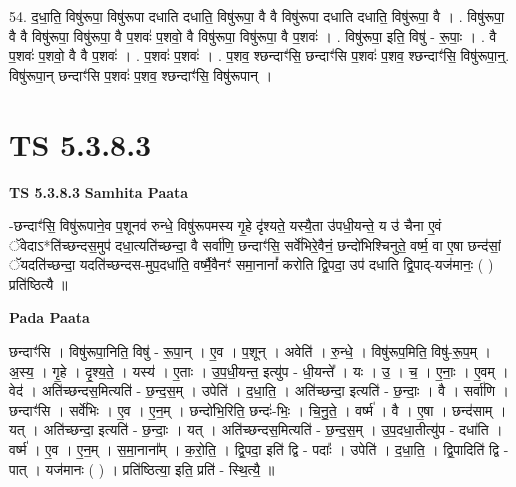 \documentclass[17pt]{extarticle}
\begin{document}
54. द॒धा॒ति॒ विषु॑रूपा॒ विषु॑रूपा दधाति दधाति॒ विषु॑रूपा॒ वै वै विषु॑रूपा दधाति दधाति॒ विषु॑रूपा॒ वै । . विषु॑रूपा॒ वै वै विषु॑रूपा॒ विषु॑रूपा॒ वै प॒शवः॑ प॒शवो॒ वै विषु॑रूपा॒ विषु॑रूपा॒ वै प॒शवः॑ । . विषु॑रूपा॒ इति॒ विषु॑ - रू॒पाः॒ । . वै प॒शवः॑ प॒शवो॒ वै वै प॒शवः॑ । . प॒शवः॑ प॒शवः॑ । . प॒शव॒ श्छन्दाꣳ॑सि॒ छन्दाꣳ॑सि प॒शवः॑ प॒शव॒ श्छन्दाꣳ॑सि॒ विषु॑रूपा॒न्॒. विषु॑रूपा॒न् छन्दाꣳ॑सि प॒शवः॑ प॒शव॒ श्छन्दाꣳ॑सि॒ विषु॑रूपान् । \newline
\pagebreak
{}

\section{ TS 5.3.8.3 }

\textbf{TS 5.3.8.3 } \newline
\textbf{Samhita Paata} \newline

-छन्दाꣳ॑सि॒ विषु॑रूपाने॒व प॒शूनव॑ रुन्धे॒ विषु॑रूपमस्य गृ॒हे दृ॑श्यते॒ यस्यै॒ता उ॑पधी॒यन्ते॒ य उ॑ चैना ए॒वं ॅवेदाऽ*ति॑च्छन्दस॒मुप॑ दधा॒त्यति॑च्छन्दा॒ वै सर्वा॑णि॒ छन्दाꣳ॑सि॒ सर्वे॑भिरे॒वैनं॒ छन्दो॑भिश्चिनुते॒ वर्ष्म॒ वा ए॒षा छन्द॑सां॒ ॅयदति॑च्छन्दा॒ यदति॑च्छन्दस-मुप॒दधा॑ति॒ वर्ष्मै॒वैनꣳ॑ समा॒नानां᳚ करोति द्वि॒पदा॒ उप॑ दधाति द्वि॒पाद्-यज॑मानः॒ ( ) प्रति॑ष्ठित्यै ॥ \newline

\textbf{Pada Paata} \newline

छन्दाꣳ॑सि । विषु॑रूपा॒निति॒ विषु॑ - रू॒पा॒न् । ए॒व । प॒शून् । अवेति॑ । रु॒न्धे॒ । विषु॑रूप॒मिति॒ विषु॑-रू॒प॒म् । अ॒स्य॒ । गृ॒हे । दृ॒श्य॒ते॒ । यस्य॑ । ए॒ताः । उ॒प॒धी॒यन्त॒ इत्यु॑प - धी॒यन्ते᳚ । यः । उ॒ । च॒ । ए॒नाः॒ । ए॒वम् । वेद॑ । अति॑च्छन्दस॒मित्यति॑ - छ॒न्द॒स॒म् । उपेति॑ । द॒धा॒ति॒ । अति॑च्छन्दा॒ इत्यति॑ - छ॒न्दाः॒ । वै । सर्वा॑णि । छन्दाꣳ॑सि । सर्वे॑भिः । ए॒व । ए॒न॒म् । छन्दो॑भि॒रिति॒ छन्दः॑-भिः॒ । चि॒नु॒ते॒ । वर्ष्म॑ । वै । ए॒षा । छन्द॑साम् । यत् । अति॑च्छन्दा॒ इत्यति॑ - छ॒न्दाः॒ । यत् । अति॑च्छन्दस॒मित्यति॑ - छ॒न्द॒स॒म् । उ॒प॒दधा॒तीत्यु॑प - दधा॑ति । वर्ष्म॑ । ए॒व । ए॒न॒म् । स॒मा॒नाना᳚म् । क॒रो॒ति॒ । द्वि॒पदा॒ इति॑ द्वि - पदाः᳚ । उपेति॑ । द॒धा॒ति॒ । द्वि॒पादिति॑ द्वि - पात् । यज॑मानः ( ) । प्रति॑ष्ठित्या॒ इति॒ प्रति॑ - स्थि॒त्यै॒ ॥  \newline
\end{document}
